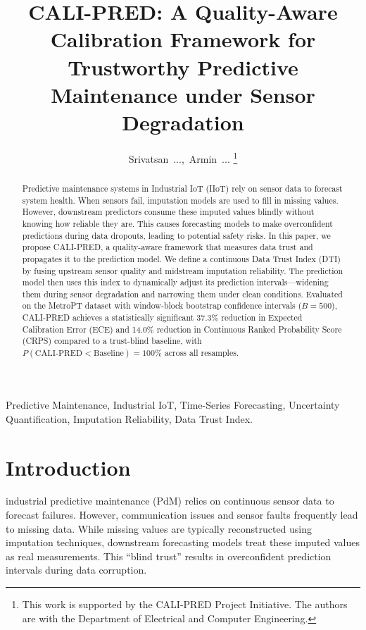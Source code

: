 \documentclass[journal]{IEEEtran}
\begin{document}
\title{CALI-PRED: A Quality-Aware Calibration Framework for Trustworthy Predictive Maintenance under Sensor Degradation}

\author{Srivatsan~...,~Armin~...
\thanks{This work is supported by the CALI-PRED Project Initiative. The authors are with the Department of Electrical and Computer Engineering.}}

\maketitle

\begin{abstract}
Predictive maintenance systems in Industrial IoT (IIoT) rely on sensor data to forecast system health. When sensors fail, imputation models are used to fill in missing values. However, downstream predictors consume these imputed values blindly without knowing how reliable they are. This causes forecasting models to make overconfident predictions during data dropouts, leading to potential safety risks. In this paper, we propose CALI-PRED, a quality-aware framework that measures data trust and propagates it to the prediction model. We define a continuous Data Trust Index (DTI) by fusing upstream sensor quality and midstream imputation reliability. The prediction model then uses this index to dynamically adjust its prediction intervals—widening them during sensor degradation and narrowing them under clean conditions. Evaluated on the MetroPT dataset with window-block bootstrap confidence intervals ($B=500$), CALI-PRED achieves a statistically significant 37.3\% reduction in Expected Calibration Error (ECE) and 14.0\% reduction in Continuous Ranked Probability Score (CRPS) compared to a trust-blind baseline, with $P(\text{CALI-PRED} < \text{Baseline}) = 100\%$ across all resamples.
\end{abstract}

\begin{IEEEkeywords}
Predictive Maintenance, Industrial IoT, Time-Series Forecasting, Uncertainty Quantification, Imputation Reliability, Data Trust Index.
\end{IEEEkeywords}

\section{Introduction}
 industrial predictive maintenance (PdM) relies on continuous sensor data to forecast failures. However, communication issues and sensor faults frequently lead to missing data. While missing values are typically reconstructed using imputation techniques, downstream forecasting models treat these imputed values as real measurements. This ``blind trust'' results in overconfident prediction intervals during data corruption.
\end{document}

